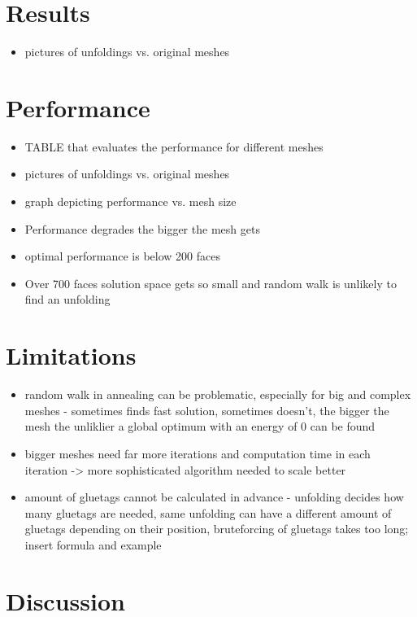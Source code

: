 \documentclass[draft,final]{vutinfth} %
\begin{document}
\section{Results}

\begin{itemize}
	\item pictures of unfoldings vs. original meshes
\end{itemize}

\section{Performance}

\begin{itemize}
	\item TABLE that evaluates the performance for different meshes
	\item pictures of unfoldings vs. original meshes
	\item graph depicting performance vs. mesh size
	\item Performance degrades the bigger the mesh gets
	\item optimal performance is below 200 faces
	\item Over 700 faces solution space gets so small and random walk is unlikely to find an unfolding
\end{itemize}

\section{Limitations}

\begin{itemize}
	\item random walk in annealing can be problematic, especially for big and complex meshes - sometimes finds fast solution, sometimes doesn't, the bigger the mesh the unliklier a global optimum with an energy of 0 can be found
	\item bigger meshes need far more iterations and computation time in each iteration -> more sophisticated algorithm needed to scale better
	\item amount of gluetags cannot be calculated in advance - unfolding decides how many gluetags are needed, same unfolding can have a different amount of gluetags depending on their position, bruteforcing of gluetags takes too long; insert formula and example
\end{itemize}

\section{Discussion}
\end{document}
